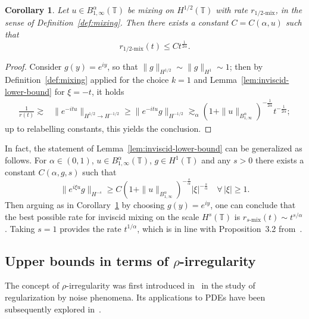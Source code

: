 \documentclass[11pt,oneside,reqno]{amsart}
\newtheorem{corollary}[theorem]{Corollary}
\numberwithin{equation}{section}
\begin{document}
\begin{corollary}
  \label{cor:inviscid-lower-bound}Let $u \in B^{\alpha}_{1, \infty}
  (\mathbb{T})$ be mixing on $H^{1 / 2} (\mathbb{T})$ with rate
  $r_{1 / 2 \text{-mix}}$, in the sense of
  Definition~\ref{def:mixing}. Then there exists a constant $C = C (\alpha,
  u)$ such that
  \[ r_{1 / 2 \text{-mix}} (t) \leqslant C t^{\frac{1}{2
     \alpha}} . \]
\end{corollary}

\begin{proof}
  Consider $g (y) = e^{i y}$, so that $\| g \|_{H^{1 / 2}} \sim
  \| g \|_{H^1} \sim 1$; then by Definition~\ref{def:mixing} applied for the
  choice $k = 1$ and Lemma~\ref{lem:inviscid-lower-bound} for $\xi = - t$, it
  holds
%  
  \begin{align*}
    \frac{1}{r (t)} \gtrsim & \| e^{- i t u} \|_{H^{1 / 2} \rightarrow H^{- 1
    / 2}} \geqslant \| e^{- i t u} g \|_{H^{- 1 / 2}} \gtrsim_{\alpha} (1 + \|
    u \|_{B^{\alpha}_{1, \infty}})^{- \frac{1}{2 \alpha}} t^{- \frac{1}{2
    \alpha}} ;
  \end{align*}
%  
  up to relabelling constants, this yields the conclusion.
\end{proof}

\begin{remark}
  \label{rem:inviscid-lower-bound}In fact, the statement of
  Lemma~\ref{lem:inviscid-lower-bound} can be generalized as follows. For
  $\alpha \in (0, 1)$, $u \in B^{\alpha}_{1, \infty} (\mathbb{T})$, $g \in H^1
  (\mathbb{T})$ and any $s > 0$ there exists a constant $C (\alpha, g, s)$
  such that
  \[ \| e^{i \xi u} g \|_{H^{- s}} \geqslant C (1 + \| u \|_{B^{\alpha}_{1,
     \infty}})^{- \frac{s}{\alpha}}  | \xi |^{- \frac{s}{\alpha}} \quad
     \forall \, | \xi | \geqslant 1. \]
  Then arguing as in Corollary~\ref{cor:inviscid-lower-bound} by
  choosing $g (y) = e^{i y}$, one can conclude that the best possible rate
  for inviscid mixing on the scale $H^s (\mathbb{T})$ is $r_{s
  \text{-mix}} (t) \sim t^{s / \alpha}$. Taking $s = 1$ provides the rate
  $t^{1 / \alpha}$, which is in line with Proposition~3.2
  from~{\cite{colombozelati}}.
\end{remark}

\subsection{Upper bounds in terms of
$\rho$-irregularity}\label{sec:upper-bound-inviscid}

The concept of $\rho$-irregularity was first introduced
in~{\cite{catellier2016averaging}} in the study of regularization by noise
phenomena. Its applications to PDEs have been subsequently explored
in~{\cite{choukgubinelli1,choukgubinelli2,galeati2020prevalence,catellier2016rough}}.
\end{document}
